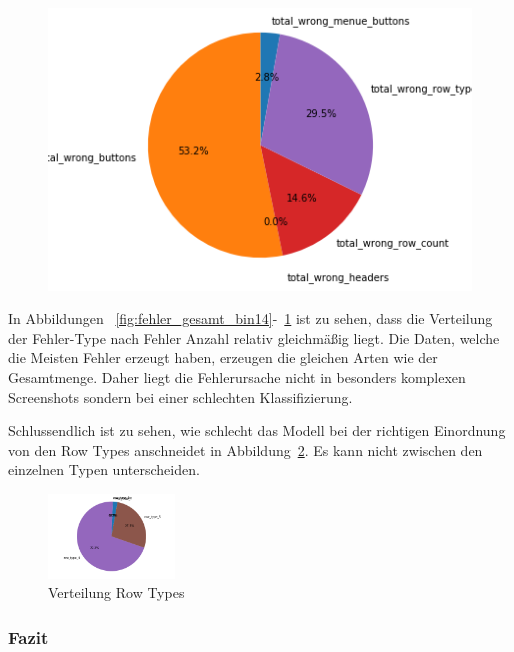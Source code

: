 \documentclass[pdftex,a4paper,halfparskip, article]{scrartcl}
\begin{document}
\begin{figure}
\begin{minipage}{.33\textwidth}
  \centering
   \includegraphics[width=1\linewidth]{predictions_bin14_p80_error_types_pie_chart}
  \label{fig:fehler_schlechteste20_bin14}
\end{minipage}
\end{figure}

In Abbildungen ~\ref{fig:fehler_gesamt_bin14}-~\ref{fig:fehler_schlechteste20_bin14} ist zu sehen, dass die Verteilung der Fehler-Type nach Fehler Anzahl relativ gleichmäßig liegt. Die Daten, welche die Meisten Fehler erzeugt haben, erzeugen die gleichen Arten wie der Gesamtmenge. Daher liegt die Fehlerursache nicht in besonders komplexen Screenshots sondern bei einer schlechten Klassifizierung.

Schlussendlich ist zu sehen, wie schlecht das Modell bei der richtigen Einordnung von den Row Types anschneidet in Abbildung~\ref{fig:bin14_row_type}. Es kann nicht zwischen den einzelnen Typen unterscheiden.


\begin{figure}[h]
\centering
\includegraphics[width=0.3\textwidth]{predictions_bin14_predicted_row_type_distribution}
\caption{Verteilung Row Types}
\label{fig:bin14_row_type}
\end{figure}


\subsubsection*{Fazit}
\end{document}
